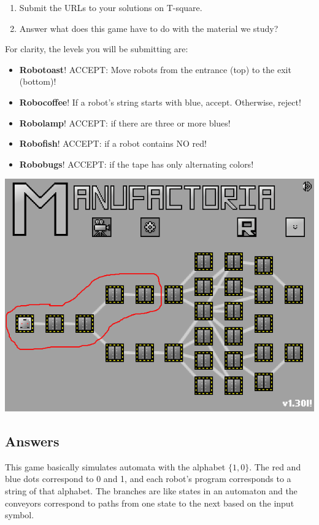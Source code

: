 \documentclass[10pt, legalpaper]{exam}
\begin{document}
\begin{questions}
\begin{enumerate}
\item Submit the URLs to your solutions on T-square.

\item Answer what does this game have to do with the material we study?\end{enumerate}
For clarity, the levels you will be submitting are:
\begin{itemize}
\item \textbf{Robotoast}! ACCEPT: Move robots from the entrance (top) to the exit (bottom)!
\item \textbf{Robocoffee}! If a robot's string starts with blue, accept. Otherwise, reject!
\item \textbf{Robolamp}! ACCEPT: if there are three or more blues!
\item \textbf{Robofish}! ACCEPT: if a robot contains NO red!
\item \textbf{Robobugs}! ACCEPT: if the tape has only alternating colors!
\end{itemize}
\includegraphics[scale=0.7]{manufactoria.png}

\subsection*{Answers}
This game basically simulates automata with the alphabet \(\{1,0\}\). The red and blue dots correspond to 0 and 1, and each robot's program corresponds to a string of that alphabet. The branches are like states in an automaton and the conveyors correspond to paths from one state to the next based on the input symbol.

\end{questions}
\end{document}
